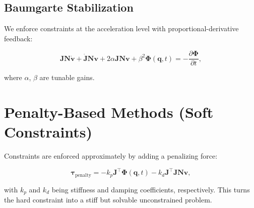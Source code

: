 \documentclass{article}
\begin{document}
\subsection{Baumgarte Stabilization}

We enforce constraints at the acceleration level with proportional-derivative
feedback:

\begin{equation}
    \bm{J} \bm{N} \dot{\bm{v}} + \dot{\bm{J}} \bm{N} \bm{v} + 2\alpha \bm{J} \bm{N} \bm{v} + \beta^2 \bm{\Phi}(\bm{q}, t) = -\frac{\partial \bm{\Phi}}{\partial t},
\end{equation}

where \( \alpha \), \( \beta \) are tunable gains.

\section{Penalty-Based Methods (Soft Constraints)}

Constraints are enforced approximately by adding a penalizing force:

\begin{equation}
    \bm{\tau}_{\text{penalty}} = -k_p \bm{J}^\top \bm{\Phi}(\bm{q}, t) - k_d \bm{J}^\top \bm{J} \bm{N} \bm{v},
\end{equation}

with \( k_p \) and \( k_d \) being stiffness and damping coefficients,
respectively. This turns the hard constraint into a stiff but solvable
unconstrained problem.

\end{document}
